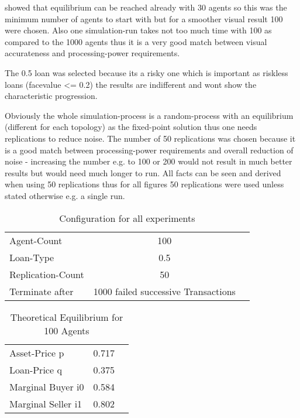 \documentclass[Bachelorarbeit.tex]{subfiles}
\begin{document}
\bigskip 

\cite{Breuer2015} showed that equilibrium can be reached already with 30 agents so this was the minimum number of agents to start with but for a smoother visual result 100 were chosen. Also one simulation-run takes not too much time with 100 as compared to the 1000 agents thus it is a very good match between visual accurateness and processing-power requirements.

\medskip

The 0.5 loan was selected because its a risky one which is important as riskless loans (facevalue <= 0.2) the results are indifferent and wont show the characteristic progression.

\medskip

Obviously the whole simulation-process is a random-process with an equilibrium (different for each topology) as the fixed-point solution thus one needs replications to reduce noise. The number of 50 replications was chosen because it is a good match between processing-power requirements and overall reduction of noise - increasing the number e.g. to 100 or 200 would not result in much better results but would need much longer to run. All facts can be seen and derived when using 50 replications thus for all figures 50 replications were used unless stated otherwise e.g. a single run.

\begin{table}[h]
	\centering
	\caption{Configuration for all experiments}
	\begin{tabular} { l c r }
		\hline
		Agent-Count & 100 \\
		Loan-Type & 0.5 \\
		Replication-Count & 50 \\
		Terminate after & 1000 failed successive Transactions \\
		\hline
	\end{tabular}
\end{table}

\begin{table}[h]
	\centering
	\caption{Theoretical Equilibrium for 100 Agents}
	\begin{tabular} { l c r }
		\hline
		Asset-Price p & 0.717 \\
		Loan-Price q & 0.375 \\
		Marginal Buyer i0 & 0.584 \\
		Marginal Seller i1 & 0.802 \\
		\hline
	\end{tabular}
	\label{tab:theoretical_equilibrium_100Agents_05Bond}
\end{table}
\end{document}
